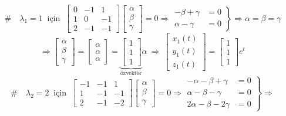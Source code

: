 \documentclass[11pt,a4paper]{article}
\begin{document}
\begin{cozum}
\[
\# \quad \lambda_1 = 1 \ \text{ için } \ \begin{bmatrix} 0 & -1 & 1 \\ 1 & 0 & -1 \\ 2 & -1 & -1 \end{bmatrix}\begin{bmatrix} \alpha \\ \beta \\ \gamma \end{bmatrix} = 0 \Rightarrow \left.\begin{aligned} -\beta + \gamma &= 0 \\ \alpha - \gamma &= 0 \end{aligned}\right\} \Rightarrow \alpha = \beta = \gamma
\]
\[
\Rightarrow \begin{bmatrix} \alpha \\ \beta \\ \gamma \end{bmatrix} = \begin{bmatrix} \alpha \\ \alpha \\ \alpha \end{bmatrix} = \underbrace{\begin{bmatrix} 1 \\ 1 \\ 1 \end{bmatrix}}_{\text{özvektör}} \alpha \ \Rightarrow \ \begin{bmatrix} x_1(t) \\ y_1(t) \\ z_1(t) \end{bmatrix} = \begin{bmatrix} 1 \\ 1 \\ 1 \end{bmatrix} e^{t}
\]
\[
\# \quad \lambda_2 = 2 \ \text{ için } \ \begin{bmatrix} -1 & -1 & 1 \\ 1 & -1 & -1 \\ 2 & -1 & -2 \end{bmatrix}\begin{bmatrix} \alpha \\ \beta \\ \gamma \end{bmatrix} = 0 \Rightarrow \left.\begin{aligned} -\alpha - \beta + \gamma &= 0 \\ \alpha - \beta - \gamma &= 0 \\ 2\alpha - \beta - 2\gamma &= 0 \end{aligned}\right\} \Rightarrow
\]
\end{cozum}
\end{document}
